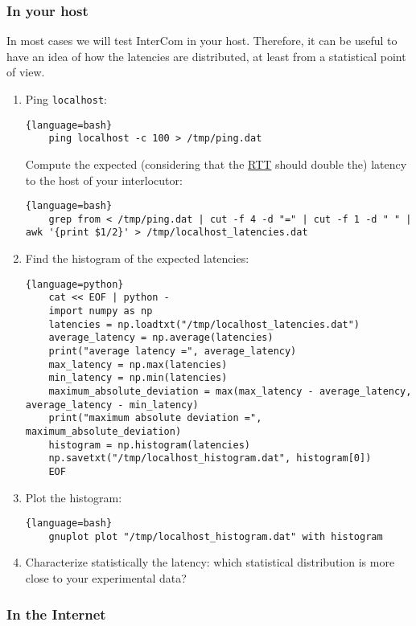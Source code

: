 \subsubsection{In your host}

In most cases we will test InterCom in your host. Therefore, it can be
useful to have an idea of how the latencies are distributed, at least
from a statistical point of view.

\begin{enumerate}
\item Ping \texttt{localhost}:
   \begin{lstlisting}{language=bash}
    ping localhost -c 100 > /tmp/ping.dat
  \end{lstlisting}
Compute the expected (considering that the
  \href{https://en.wikipedia.org/wiki/Round-trip_delay}{RTT} should
  double the) latency to the host of your interlocutor:
  \begin{lstlisting}{language=bash}
    grep from < /tmp/ping.dat | cut -f 4 -d "=" | cut -f 1 -d " " | awk '{print $1/2}' > /tmp/localhost_latencies.dat
  \end{lstlisting}

\item Find the histogram of the expected latencies:
  \begin{lstlisting}{language=python}
    cat << EOF | python -
    import numpy as np
    latencies = np.loadtxt("/tmp/localhost_latencies.dat")
    average_latency = np.average(latencies)
    print("average latency =", average_latency)
    max_latency = np.max(latencies)
    min_latency = np.min(latencies)
    maximum_absolute_deviation = max(max_latency - average_latency, average_latency - min_latency)
    print("maximum absolute deviation =", maximum_absolute_deviation)
    histogram = np.histogram(latencies)
    np.savetxt("/tmp/localhost_histogram.dat", histogram[0])
    EOF
  \end{lstlisting}

\item Plot the histogram:
  \begin{lstlisting}{language=bash}
    gnuplot plot "/tmp/localhost_histogram.dat" with histogram
  \end{lstlisting}
  
\item Characterize statistically the latency: which statistical
  distribution is more close to your experimental data?
\end{enumerate}

\subsubsection{In the Internet}


